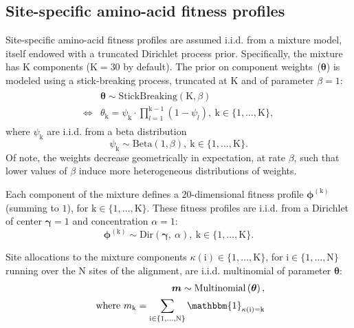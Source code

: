 \documentclass{article}
\newcommand{\UniDimArray}[1]{\bm{#1}}
\newcommand{\indice}{l}
\newcommand{\site}{\text{i}}
\newcommand{\Nsite}{\text{N}}
\newcommand{\Setsite}{\site \in \{1, \hdots, \Nsite\} }
\newcommand{\cat}{\text{k}}
\newcommand{\Ncat}{\text{K}}
\newcommand{\catexp}{^{(\cat)}}
\newcommand{\catInterval}{\{1, \hdots, \Ncat\}}
\newcommand{\Setcat}{\cat \in \catInterval }
\newcommand{\profile}{\phi}
\newcommand{\Profile}{\UniDimArray{\profile}}
\newcommand{\concentrationProfile}{\alpha}
\newcommand{\centerProfile}{\UniDimArray{\gamma}}
\newcommand{\catVar}{\kappa}
\newcommand{\catsite}{\catVar\left(\site\right)}
\newcommand{\catmultivar}{m}
\newcommand{\catMultiVar}{\UniDimArray{\catmultivar}}
\newcommand{\stickbreaking}{\theta}
\newcommand{\StickBreaking}{\UniDimArray{\stickbreaking}}
\newcommand{\stick}{\psi}
\newcommand{\stickbreakinghyper}{\beta}
\begin{document}
    \subsection{Site-specific amino-acid fitness profiles}
    \label{sec:profiles}
    Site-specific amino-acid fitness profiles are assumed i.i.d. from a mixture model, itself endowed with a truncated Dirichlet process prior.
    Specifically, the mixture has $\Ncat$ components ($\Ncat = 30$ by default).
    The prior on component weights~($\StickBreaking$) is modeled using a stick-breaking process, truncated at $\Ncat$ and of parameter $\stickbreakinghyper=1$:
    \begin{align}
        \label{eq:DistribStickBreaking}
        \begin{split}
            & \StickBreaking \sim \text{StickBreaking}\left( \Ncat, \stickbreakinghyper \right)\\
            \iff & \stickbreaking_{\cat} = \stick_{\cat}\cdot \prod _{{\indice=1}}^{{\cat-1}}\left(1-\stick_{\indice}\right),\ \Setcat,
        \end{split}
    \end{align}
    where $\stick_{\cat}$ are i.i.d. from a beta distribution
    \begin{equation}
        \label{eq:Beta}
        \stick_{\cat} \sim \text{Beta}\left( 1, \stickbreakinghyper \right),\ \Setcat.
    \end{equation}
    Of note, the weights decrease geometrically in expectation, at rate $\stickbreakinghyper$, such that lower values of $\stickbreakinghyper$ induce more heterogeneous distributions of weights.

    Each component of the mixture defines a 20-dimensional fitness profile $\Profile\catexp$ (summing to $1$), for $ \Setcat$.
    These fitness profiles are i.i.d. from a Dirichlet of center $\centerProfile=1$ and concentration $\concentrationProfile=1$:
    \begin{equation}
        \label{eq:DistribBase}
        \Profile\catexp \sim \text{Dir}\left( \centerProfile,\ \concentrationProfile \right),\ \Setcat.
    \end{equation}

    Site allocations to the mixture components $\catsite \in \catInterval $, for $\Setsite$ running over the $\Nsite$ sites of the alignment, are i.i.d. multinomial of parameter $\StickBreaking$:
    \begin{align}
        \label{eq:DistribMultinomial}
        \catMultiVar \sim \text{Multinomial}\left( \StickBreaking \right), \\
        \text{ where } \catmultivar_{\cat} = \sum_{\Setsite} \mathbbm{1}_{\catsite = \cat}
    \end{align}
\end{document}
